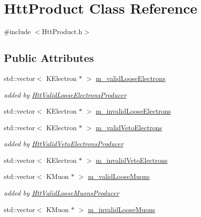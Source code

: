 \hypertarget{classHttProduct}{
\section{HttProduct Class Reference}
\label{classHttProduct}
}


{\ttfamily \#include $<$HttProduct.h$>$}\subsection*{Public Attributes}
\begin{DoxyCompactItemize}
\item 
std::vector$<$ KElectron $\ast$ $>$ \hyperlink{classHttProduct_ac87470e7729b6905e0a309224834180c}{m\_\-validLooseElectrons}
\begin{DoxyCompactList}\small\item\em added by \hyperlink{classHttValidLooseElectronsProducer}{HttValidLooseElectronsProducer} \item\end{DoxyCompactList}\item 
std::vector$<$ KElectron $\ast$ $>$ \hyperlink{classHttProduct_a82093fe39383edfbc2979d94d7571b9c}{m\_\-invalidLooseElectrons}
\item 
std::vector$<$ KElectron $\ast$ $>$ \hyperlink{classHttProduct_a3450684de78cac75697b14e7dd778fbe}{m\_\-validVetoElectrons}
\begin{DoxyCompactList}\small\item\em added by \hyperlink{classHttValidVetoElectronsProducer}{HttValidVetoElectronsProducer} \item\end{DoxyCompactList}\item 
std::vector$<$ KElectron $\ast$ $>$ \hyperlink{classHttProduct_affc89af16634fbc01c58de3632220b1f}{m\_\-invalidVetoElectrons}
\item 
std::vector$<$ KMuon $\ast$ $>$ \hyperlink{classHttProduct_a0d748a5f5c91b50ee29939c0b1ee23c1}{m\_\-validLooseMuons}
\begin{DoxyCompactList}\small\item\em added by \hyperlink{classHttValidLooseMuonsProducer}{HttValidLooseMuonsProducer} \item\end{DoxyCompactList}\item 
std::vector$<$ KMuon $\ast$ $>$ \hyperlink{classHttProduct_a66da1a4ef1d2123a91736e848c59eeed}{m\_\-invalidLooseMuons}
\item 

\end{DoxyCompactItemize}
